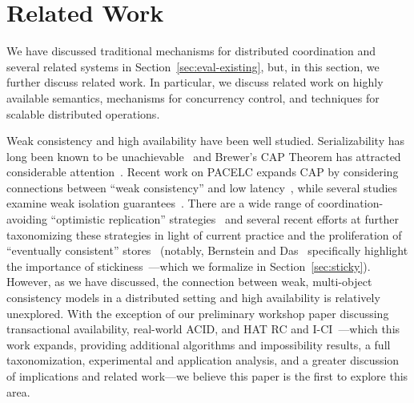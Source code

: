 
\section{Related Work}
\label{sec:relatedwork}

We have discussed traditional mechanisms for distributed
coordination and several related systems in
Section~\ref{sec:eval-existing}, but, in this section, we further discuss
related work. In particular, we discuss related work on highly
available semantics, mechanisms for concurrency control, and
techniques for scalable distributed operations.

Weak consistency and high availability have been well
studied. Serializability has long been known to be
unachievable~\cite{davidson-survey} and Brewer's CAP Theorem has
attracted considerable attention~\cite{gilbert-cap}. Recent work on
PACELC expands CAP by considering connections between ``weak
consistency'' and low latency~\cite{abadi-pacelc}, while several
studies examine weak isolation guarantees~\cite{adya,
  ansicritique}. There are a wide range of coordination-avoiding
``optimistic replication'' strategies~\cite{optimistic} and several
recent efforts at further taxonomizing these strategies in light of
current practice and the proliferation of ``eventually consistent''
stores~\cite{bailis-ec, bernstein-survey} (notably, Bernstein and
Das~\cite{bernstein-survey} specifically highlight the importance of
stickiness~\cite{sessionguarantees, vogels-defs}---which we formalize
in Section~\ref{sec:sticky}).  However, as we have discussed, the
connection between weak, multi-object consistency models in a
distributed setting and high availability is relatively
unexplored. With the exception of our preliminary workshop paper
discussing transactional availability, real-world ACID, and HAT RC and
I-CI~\cite{hat-hotos}---which this work expands, providing additional
algorithms and impossibility results, a full taxonomization,
experimental and application analysis, and a greater discussion of
implications and related work---we believe this paper is the first to
explore this area.


